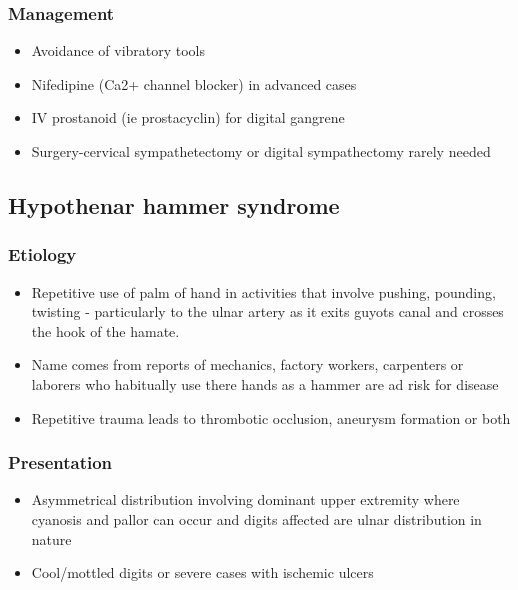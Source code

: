 \documentclass[
]{book}
\begin{document}
\hypertarget{management-5}{%
\subsubsection{Management}\label{management-5}}

\begin{itemize}
\item
  Avoidance of vibratory tools
\item
  Nifedipine (Ca2+ channel blocker) in advanced cases
\item
  IV prostanoid (ie prostacyclin) for digital gangrene
\item
  Surgery-cervical sympathetectomy or digital sympathectomy rarely
  needed\\
\end{itemize}

\hypertarget{hypothenar-hammer-syndrome}{%
\subsection{Hypothenar hammer syndrome}\label{hypothenar-hammer-syndrome}}

\hypertarget{etiology-4}{%
\subsubsection{Etiology}\label{etiology-4}}

\begin{itemize}
\item
  Repetitive use of palm of hand in activities that involve pushing,
  pounding, twisting - particularly to the ulnar artery as it exits
  guyots canal and crosses the hook of the hamate.\citep{ferris2000}
\item
  Name comes from reports of mechanics, factory workers, carpenters or
  laborers who habitually use there hands as a hammer are ad risk for
  disease
\item
  Repetitive trauma leads to thrombotic occlusion, aneurysm formation
  or both
\end{itemize}

\hypertarget{presentation-4}{%
\subsubsection{Presentation}\label{presentation-4}}

\begin{itemize}
\item
  Asymmetrical distribution involving dominant upper extremity where
  cyanosis and pallor can occur and digits affected are ulnar
  distribution in nature
\item
  Cool/mottled digits or severe cases with ischemic ulcers
\end{itemize}
\end{document}
